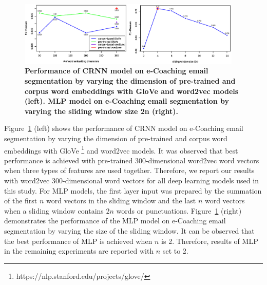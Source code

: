 \documentclass{amia}
\begin{document}
\begin{figure}[!htb]
    \centering
    \includegraphics[width=0.95\textwidth]{figures/mlp-and-vector.eps}
    \caption{\textbf{Performance of CRNN model on e-Coaching email segmentation by varying the dimension of pre-trained and corpus word embeddings with GloVe and word2vec models (left). MLP model on e-Coaching email segmentation by varying the sliding window size 2n (right).}}
    \label{fig:embedding-dimension-mlp}
\end{figure}   

Figure~\ref{fig:embedding-dimension-mlp} (left) shows the performance of CRNN model on e-Coaching email segmentation by varying the dimension of pre-trained and corpus word embeddings with GloVe \footnote{https://nlp.stanford.edu/projects/glove/} and word2vec models. It was observed that best performance is achieved with pre-trained 300-dimensional word2vec word vectors when three types of features are used together. Therefore, we report our results with word2vec 300-dimensional word vectors for all deep learning models used in this study. For MLP models, the first layer input was prepared by the summation of the first $n$ word vectors in the sliding window and the last $n$ word vectors when a sliding window contains $2n$ words or punctuations. Figure~\ref{fig:embedding-dimension-mlp} (right) demonstrates the performance of the MLP model on e-Coaching email segmentation by varying the size of the sliding window. It can be observed that the best performance of MLP is achieved when $n$ is 2. Therefore, results of MLP in the remaining experiments are reported with $n$ set to 2.
\end{document}
